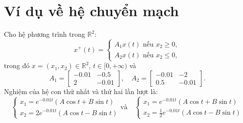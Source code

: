 \documentclass[14pt,a4paper,oneside]{report}		%
\theoremstyle{definition}
\begin{document}
\section{Ví dụ về hệ chuyển mạch}
Cho hệ phương trình trong $\mathbb{R}^2$:
$$x^+(t) = 
\begin{cases} 
A_1x(t) \mbox{ nếu } x_2\geq 0, \\ 
A_2x(t) \mbox{ nếu } x_2\leq 0,
\end{cases}
$$
trong đó $x=(x_1,x_2)\in\mathbb{R}^2$, $t\in[0,+\infty)$ và
$$
A_1 = \begin{bmatrix} -0.01 & -0.5 \\ 2 & -0.01 \end{bmatrix} ,\quad 
A_2 = \begin{bmatrix} -0.01 & -2 \\ 0.5 & -0.01 \end{bmatrix} .
$$
Nghiệm của hệ con thứ nhất và thứ hai lần lượt là:
\begin{equation} \label{vd1}
\begin{cases}
x_1 = e^{-0.01t}(A\cos t+B\sin t)\\
x_2 = 2e^{-0.01t}(A\cos t-B\sin t)
\end{cases}
\text{và}\quad
\begin{cases}
x_1 = e^{-0.01t}(A\cos t+B\sin t)\\
x_2 = \frac{1}{2} e^{-0.01t}(A\cos t-B\sin t)
\end{cases}
\end{equation}
\end{document}
